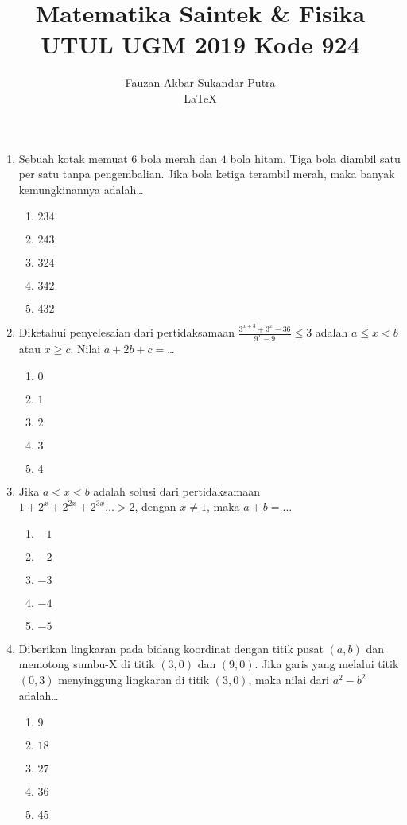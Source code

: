 \documentclass[A4,12PT, english, twocolumn]{journal}
\title{Matematika Saintek \& Fisika UTUL UGM 2019 Kode 924}
\author{Fauzan Akbar Sukandar Putra \\ \LaTeX}
\begin{document}
\maketitle

\begin{enumerate}
\item Sebuah kotak memuat $6$ bola merah dan $4$ bola hitam. Tiga bola diambil satu per satu tanpa pengembalian. Jika bola ketiga terambil merah, maka banyak kemungkinannya adalah\dots
    \begin{enumerate}
        \item $234$ 
        \item $243$
        \item $324$
        \item $342$
        \item $432$
    \end{enumerate}
  
\item Diketahui penyelesaian dari pertidaksamaan $\frac{3^{x+3}+3^x-36}{9^x-9}\leq3$ adalah $a\leq x< b$ atau
$x \geq c$. Nilai $a+2b+c=$\dots
    \begin{enumerate}
        \item $0$
        \item $1$
        \item $2$
        \item $3$
        \item $4$
    \end{enumerate}
     
\item Jika $a<x<b$ adalah solusi dari pertidaksamaan\\$1+2^x+2^{2x}+2^{3x}...>2$, dengan $x \neq 1$, maka $a+b=\dots$
    \begin{enumerate}
        \item $-1$
        \item $-2$
        \item $-3$
        \item $-4$
        \item $-5$
    \end{enumerate}
   
\item Diberikan lingkaran pada bidang koordinat dengan titik pusat $(a,b)$ dan memotong sumbu-X di titik $(3,0)$ dan $(9,0)$. Jika garis yang melalui titik $(0,3)$ menyinggung lingkaran di titik $(3,0)$, maka nilai dari $a^2-b^2$ adalah\dots
    \begin{enumerate}
        \item $9$
        \item $18$
        \item $27$
        \item $36$
        \item $45$
    \end{enumerate}


\end{enumerate}
\end{document}
